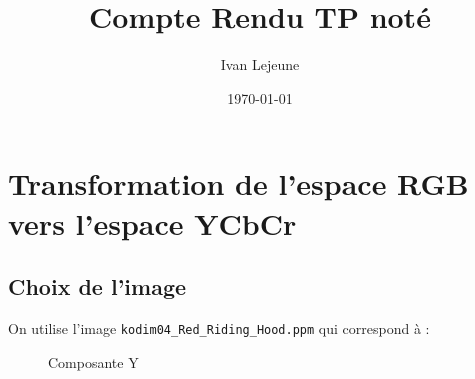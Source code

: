 \documentclass[french,a4paper,10pt]{article}
\title{Compte Rendu TP noté}
\author{Ivan Lejeune}
\date{\today}
\begin{document}
    \maketitle

    \tableofcontents

    \newpage
   
    \section{Transformation de l'espace RGB vers l'espace YCbCr}\label{sec:1}

    \subsection{Choix de l'image}\label{subsec:1.1}

    On utilise l'image \texttt{kodim04\_Red\_Riding\_Hood.ppm} qui correspond à :

    \begin{figure}[!htb]
        \begin{minipage}{0.48\textwidth}
            \centering
            \caption{Composante Y}\label{Fig:peppers_y}
        \end{minipage}\hfill
    \end{figure}
\end{document}
